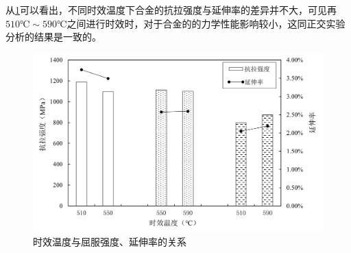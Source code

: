从\ref{fig:sqy}可以看出，不同时效温度下合金的抗拉强度与延伸率的差异并不大，可见再$510℃\sim 590℃$之间进行时效时，对于合金的的力学性能影响较小，这同正交实验分析的结果是一致的。
\begin{figure}[h!]
	\centering
	\includegraphics[width=1\linewidth]{pic/时效温度与屈服强度、延伸率的关系}
	\caption{时效温度与屈服强度、延伸率的关系}
	\label{fig:sqy}
\end{figure}


